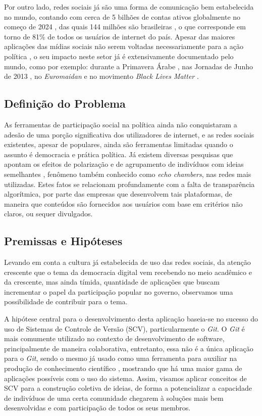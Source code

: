 Por outro lado, redes sociais já são uma forma de comunicação bem estabelecida no mundo, contando com cerca de 5 bilhões de contas ativos globalmente no começo de 2024 \cite{globalSocialMediaStatistics}, das quais 144 milhões são brasileiras \cite{brazilSocialMediaStatistics}, o que corresponde em torno de 81\% de todos os usuários de internet do país. Apesar das maiores aplicações das mídias sociais não serem voltadas necessariamente para a ação política \cite{reviewSocialMedia}, o seu impacto neste setor já é extensivamente documentado pelo mundo, como por exemplo: durante a Primavera Árabe \cite{arabSpring}, nas Jornadas de Junho de 2013 \cite{journey2013}, no \textit{Euromaidan}\cite{euromaidan} e no movimento \textit{Black Lives Matter} \cite{blackLivesMatter}.

\subsection{Definição do Problema}
As ferramentas de participação social na política ainda não conquistaram a adesão de uma porção significativa dos utilizadores de internet, e as redes sociais existentes, apesar de populares, ainda são ferramentas limitadas quando o assunto é democracia e prática política. Já existem diversas pesquisas que apontam os efeitos de polarização \cite{journey2013, polarizationSocialMedia} e de agrupamento de indivíduos com ideias semelhantes \cite{echoChamber}, fenômeno também conhecido como \textit{echo chambers}, nas redes mais utilizadas. Estes fatos se relacionam profundamente com a falta de transparência algorítmica, por parte das empresas que desenvolvem tais plataformas, de maneira que conteúdos são fornecidos aos usuários com base em critérios não claros, ou sequer divulgados.

\subsection{Premissas e Hipóteses}

Levando em conta a cultura já estabelecida de uso das redes sociais, da atenção crescente que o tema da democracia digital vem recebendo no meio acadêmico \cite{ddBrazil, ddWorld} e da crescente, mas ainda tímida, quantidade de aplicações que buscam incrementar o papel da participação popular no governo, observamos uma possibilidade de contribuir para o tema.

A hipótese central para o desenvolvimento desta aplicação  baseia-se no sucesso do uso de Sistemas de Controle de Versão (SCV), particularmente o \textit{Git}. O \textit{Git} é mais comumente utilizado no contexto de desenvolvimento de software, principalmente de maneira colaborativa, entretanto, essa não é a única aplicação para o \textit{Git}, sendo o mesmo já usado como uma ferramenta para auxiliar na produção de conhecimento científico \cite{scienceGit}, mostrando que há uma maior gama de aplicações possíveis com o uso do sistema. Assim, visamos aplicar conceitos de SCV para a construção coletiva de ideias, de forma a potencializar a capacidade de indivíduos de uma certa comunidade chegarem à soluções mais bem desenvolvidas e com participação de todos os seus membros.

